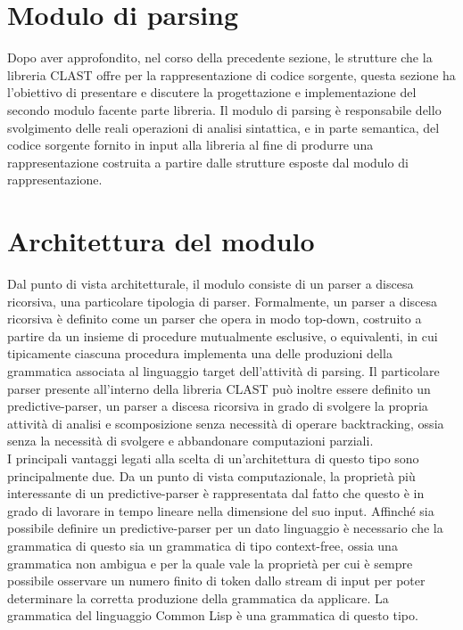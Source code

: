 \section{Modulo di parsing}

Dopo aver approfondito, nel corso della precedente sezione, le strutture che
la libreria CLAST offre per la rappresentazione di codice sorgente, questa
sezione ha l’obiettivo di presentare e discutere la progettazione e
implementazione del secondo modulo facente parte libreria. Il modulo di
parsing è responsabile dello svolgimento delle reali operazioni di analisi
sintattica, e in parte semantica, del codice sorgente fornito in input alla
libreria al fine di produrre una rappresentazione costruita a partire dalle
strutture esposte dal modulo di rappresentazione.

\section{Architettura del modulo}

Dal punto di vista architetturale, il modulo consiste di un parser a discesa
ricorsiva, una particolare tipologia di parser. Formalmente, un parser a
discesa ricorsiva è definito come un parser che opera in modo top-down,
costruito a partire da un insieme di procedure mutualmente esclusive, o
equivalenti, in cui tipicamente ciascuna procedura implementa una delle
produzioni della grammatica associata al linguaggio target dell’attività di
parsing. Il particolare parser presente all’interno della libreria CLAST può
inoltre essere definito un predictive-parser, un parser a discesa ricorsiva in
grado di svolgere la propria attività di analisi e scomposizione senza
necessità di operare backtracking, ossia senza la necessità di svolgere e
abbandonare computazioni parziali.\\

I principali vantaggi legati alla scelta di un’architettura di questo tipo
sono principalmente due. Da un punto di vista computazionale, la proprietà più
interessante di un predictive-parser è rappresentata dal fatto che questo è in
grado di lavorare in tempo lineare nella dimensione del suo input. Affinché
sia possibile definire un predictive-parser per un dato linguaggio è
necessario che la grammatica di questo sia un grammatica di tipo context-free,
ossia una grammatica non ambigua e per la quale vale la proprietà per cui è
sempre possibile osservare un numero finito di token dallo stream di input per
poter determinare la corretta produzione della grammatica da applicare. La
grammatica del linguaggio Common Lisp è una grammatica di questo tipo.\\

